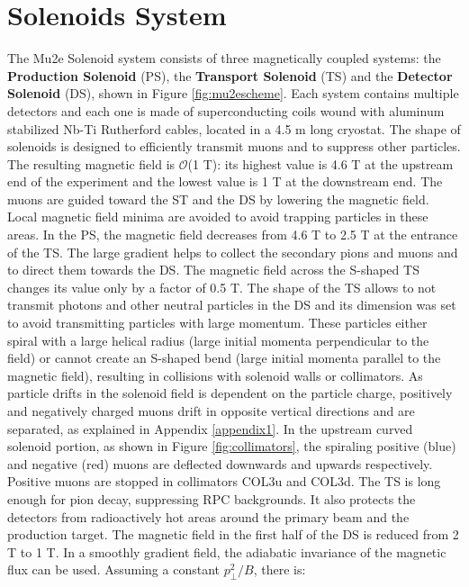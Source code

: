 \section{Solenoids System}
The Mu2e Solenoid system consists of three magnetically coupled systems: 
the \textbf{Production Solenoid} (PS), the \textbf{Transport Solenoid} (TS) 
and the \textbf{Detector Solenoid} (DS), shown in Figure \ref{fig:mu2escheme}. 
Each system contains multiple detectors and each one is made of superconducting 
coils wound with aluminum stabilized Nb-Ti Rutherford cables, located in a 4.5 m 
long cryostat. The shape of solenoids is designed to efficiently transmit muons 
and to suppress other particles. The resulting magnetic field is $\mathcal{O}$(1 T): 
its highest value is 4.6 T at the upstream end of the experiment and the lowest value 
is 1 T at the downstream end. 
The muons are guided toward the ST and the DS by lowering the magnetic field. 
Local magnetic field minima are avoided to avoid trapping particles in these areas. 
In the PS, the magnetic field decreases from 4.6 T to 2.5 T at the entrance of 
the TS. The large gradient helps to collect the secondary pions and muons and to 
direct them towards the DS. The magnetic field across the S-shaped TS changes its 
value only by a factor of 0.5 T. The shape of the TS allows to not transmit photons 
and other neutral particles in the DS and its dimension was set to avoid transmitting 
particles with large momentum. These particles either spiral with a large helical 
radius (large initial momenta perpendicular to the field) or cannot create an 
S-shaped bend (large initial momenta parallel to the magnetic field), resulting 
in collisions with solenoid walls or collimators. As particle drifts in the solenoid 
field is dependent on the particle charge, positively and negatively charged muons 
drift in opposite vertical directions and are separated, as explained in Appendix 
\ref{appendix1}. In the upstream curved solenoid portion, as shown in Figure 
\ref{fig:collimators}, the spiraling positive (blue) and negative (red) muons 
are deflected downwards and upwards respectively. Positive muons are stopped in 
collimators COL3u and COL3d. The TS is long enough for pion decay, suppressing 
RPC backgrounds. It also protects the detectors from radioactively hot areas around 
the primary beam and the production target. The magnetic field in the first half of 
the DS is reduced from 2 T to 1 T. In a smoothly gradient field, the adiabatic 
invariance of the magnetic flux can be used. Assuming a constant $p^2_\perp/B$, there is:
